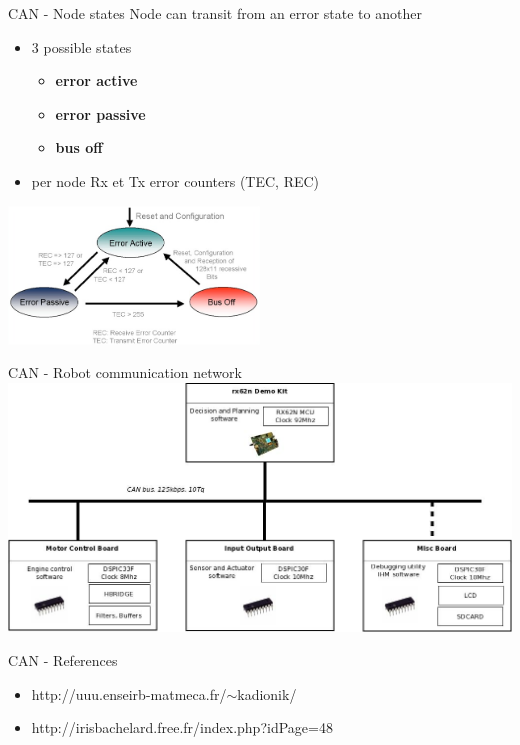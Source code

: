 \begin{frame}{CAN - Node states}
  Node can transit from an error state to another
  \begin{itemize}
  \item 3 possible states
    \begin{itemize}
    \item \textbf{error active}
    \item \textbf{error passive}
    \item \textbf{bus off}
    \end{itemize}
  \item per node Rx et Tx error counters (TEC, REC)
  \end{itemize}

  \smallskip
  \begin{center}
    \includegraphics[width=0.5\textwidth]{figures/can_states.jpeg}
  \end{center}
\end{frame}

\begin{frame}{CAN - Robot communication network}
  \includegraphics[width=\textwidth]{figures/igrebot_2011.jpg}
\end{frame}

\begin{frame}{CAN - References}
  \begin{itemize}
  \item http://uuu.enseirb-matmeca.fr/$\sim$kadionik/
  \item http://irisbachelard.free.fr/index.php?idPage=48
  \end{itemize}
\end{frame}

